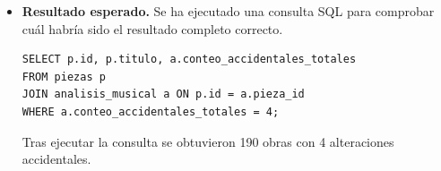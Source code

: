 \begin{itemize}
*   **The Kerry Lassie** de 1/48b K (Compás: 2/2, Tonalidad: D major)
*   **Peggy’s Dream** de 1/79a K (Compás: 2/2, Tonalidad: D major)
*   **Jig (Paddy McFadden Vick Phawdeen)** de 1/101b K (Compás: 6/8, Tonalidad: A minor)
*   **The Green Fields of Erin** de 1/122c L (K?) (Compás: 2/4, Tonalidad: E minor)
*   **‘Bh-fuilleann Tú ad Chodladh, aro Mháire?’** de 1/182a K (Compás: 9/8, Tonalidad: D major)
*   **The Lisburn Lasses. Reel** de 1/37a K (Compás: 2/2, Tonalidad: D major)
*   **There is Nothing like Pride about Me** de 1/163b (Compás: 9/8, Tonalidad: E minor)
*   **The Telegraph Reel** de 2/180a Doogan MS (Compás: 4/4, Tonalidad: D major)
*   **The Man-of-War Hornpipe** de 3/24b (Compás: 4/4, Tonalidad: G major)
*   **The Lowlands of Scotland** de 3/163b (Compás: 2/2, Tonalidad: E minor)"   
\item \textbf{Resultado esperado.} Se ha ejecutado una consulta SQL para comprobar cuál habría sido el resultado completo correcto.
    \begin{verbatim}
SELECT p.id, p.titulo, a.conteo_accidentales_totales
FROM piezas p
JOIN analisis_musical a ON p.id = a.pieza_id
WHERE a.conteo_accidentales_totales = 4;
    \end{verbatim}    
    Tras ejecutar la consulta se obtuvieron 190 obras con 4 alteraciones accidentales.

\end{itemize}


